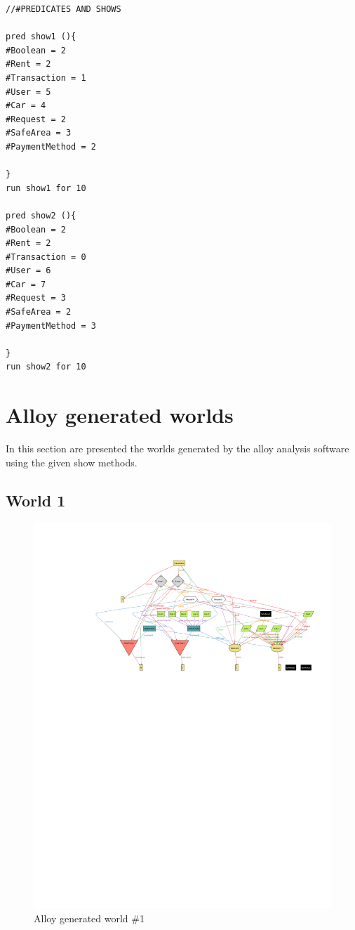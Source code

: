 \begin{lstlisting}[breaklines=true]
//#PREDICATES AND SHOWS

pred show1 (){
#Boolean = 2
#Rent = 2
#Transaction = 1
#User = 5
#Car = 4
#Request = 2
#SafeArea = 3
#PaymentMethod = 2

}
run show1 for 10

pred show2 (){
#Boolean = 2
#Rent = 2
#Transaction = 0
#User = 6
#Car = 7
#Request = 3
#SafeArea = 2
#PaymentMethod = 3

}
run show2 for 10

\end{lstlisting}

\section{Alloy generated worlds}
In this section are presented the worlds generated by the alloy analysis software using the given show methods.
\subsection{World 1}
\begin{figure}[H]
\centering
\includegraphics[width=\textheight,keepaspectratio, angle=90]{../images/alloy/world1.pdf}
\caption{Alloy generated world \#1}
\end{figure}


